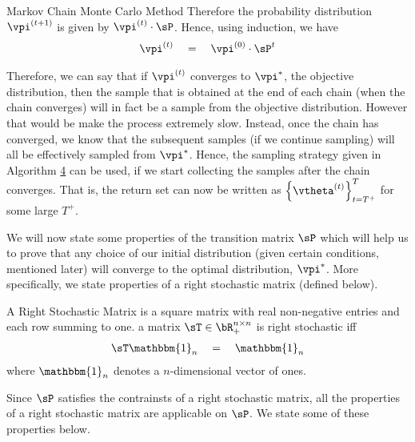 \documentclass[11pt,a4paper]{article}
\begin{document}
\begin{ssection}{Markov Chain Monte Carlo Method}
	Therefore the probability distribution $\vpi^{(t + 1)}$ is given by $\vpi^{(t)} \cdot \sP$. Hence, using induction, we have
	\begin{align*}
		\vpi^{(t)} \eq \vpi^{(0)} \cdot \sP^t
	\end{align*}

	Therefore, we can say that if $\vpi^{(t)}$ converges to $\vpi^{\ast}$, the objective distribution, then the sample that is obtained at the end of each chain (when the chain converges) will in fact be a sample from the objective distribution. However that would be make the process extremely slow. Instead, once the chain has converged, we know that the subsequent samples (if we continue sampling) will all be effectively sampled from $\vpi^{\ast}$. Hence, the sampling strategy given in Algorithm \hyperlink{algo:4}{4} can be used, if we start collecting the samples after the chain converges. That is, the return set can now be written as $\set{\vtheta^{(t)}}_{t = T^+}^{T}$ for some large $T^+$.

	We will now state some properties of the transition matrix $\sP$ which will help us to prove that any choice of our initial distribution (given certain conditions, mentioned later) will converge to the optimal distribution, \ie $\vpi^{\ast}$. More specifically, we state properties of a right stochastic matrix (defined below).

	\begin{definition}
		A Right Stochastic Matrix is a square matrix with real non-negative entries and each row summing to one. \ie a matrix $\sT \in \bR_+^{n \times n}$ is right stochastic iff
		\begin{align*}
			\sT \mathbbm{1}_n \eq \mathbbm{1}_n
		\end{align*}
		where $\mathbbm{1}_n$ denotes a $n$-dimensional vector of ones.
	\end{definition}

	Since $\sP$ satisfies the contrainsts of a right stochastic matrix, all the properties of a right stochastic matrix are applicable on $\sP$. We state some of these properties below.


\end{ssection}
\end{document}
